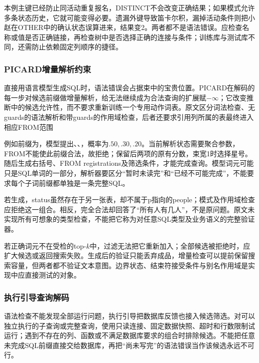 本例主键已经防止同活动重复报名，DISTINCT不会改变正确结果；如果模式允许多条状态历史，它就可能变得必要。遗漏外键导致笛卡尔积，漏掉活动条件则把小赵在OTHER中的确认状态误算进来，结果变2。两者都不是语法错误。应检查名称或值是否正确链接，再检查树中是否选择正确的连接与条件；训练库与测试库不同，还需防止依赖固定列顺序的捷径。

\subsubsection{PICARD增量解析约束}
\label{sec:nlp-analysis-picard}

直接用语言模型生成SQL时，语法错误会占据束中的宝贵位置。PICARD在解码的每一步对候选前缀做增量解析，给无法继续成为合法查询的扩展赋$-\infty$；它改变推断中的候选允许性，而不要求重新训练一个专用动作词表。原文区分词法检查、无guards的语法解析和带guards的作用域检查，后者还要求引用列所属的表最终进入相应FROM范围

例如前缀为，模型提出、\code{*}、，概率为$.50,.30,.20$。当前解析状态需要聚合参数，FROM不能使此前缀合法，故拒绝；保留后两项的原有分数，束宽1时选择星号。随后生成右括号、FROM registrations及筛选条件，才能完成查询。模型词元可能只是SQL单词的一部分，解析器要区分“暂时未读完”和“已经不可能完成”，不能要求每个子词前缀都单独是一条完整SQL。

若生成，status虽然存在于另一张表，却不属于p指向的people；模式及作用域检查应拒绝这一组合。相反，完全合法却回答了“所有人有几人”，不是原问题。原文未实现所有可想象的类型检查，不能把它称为对任意SQL类型及业务语义的完整验证器。

若正确词元不在受检的top-$k$中，过滤无法把它重新加入；全部候选被拒绝时，应扩大候选或返回搜索失败。生成后的验证只能丢弃成品，增量检查可以提前保留搜索容量，但两者都不验证文本意图。边界状态、结束符接受条件与别名作用域是实现中应直接测试的对象。

\subsubsection{执行引导查询解码}
\label{sec:nlp-analysis-execution-guided}

语法检查不能发现全部运行问题，执行引导把数据库反馈也接入候选筛选。对可以独立执行的子查询或完整查询，使用只读连接、固定数据快照、超时和行数限制试运行；遇到不存在的列、函数或不满足数据库要求的组合时排除候选。不能把任意未完成SQL前缀直接交给数据库，再把“尚未写完”的语法错误当作该候选永远不可行。

